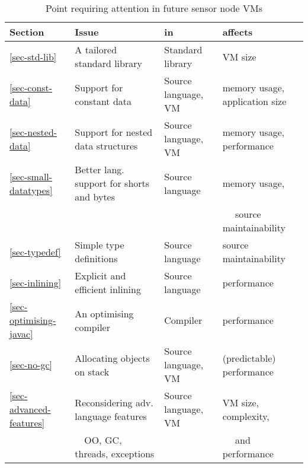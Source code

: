 \begin{table}
\caption{Point requiring attention in future sensor node VMs}
\label{tbl-issues}
    \begin{tabular}{llll}
    \toprule
    \bfseries Section           & \bfseries Issue                               & \bfseries in          & \bfseries affects \\
    \midrule
    \midrule
    \ref{sec-std-lib}           & A tailored standard library                   & Standard library      & VM size \\
    \ref{sec-const-data}        & Support for constant data                     & Source language, VM   & memory usage, application size \\
    \ref{sec-nested-data}       & Support for nested data structures            & Source language, VM   & memory usage, performance \\
    \ref{sec-small-datatypes}   & Better lang. support for shorts and bytes     & Source language       & memory usage, \\
                                &                                               &                       & ~~  source maintainability\\
    \ref{sec-typedef}           & Simple type definitions                       & Source language       & source maintainability \\
    \ref{sec-inlining}          & Explicit and efficient inlining               & Source language       & performance \\
    \ref{sec-optimising-javac}  & An optimising compiler                        & Compiler              & performance \\
    \ref{sec-no-gc}             & Allocating objects on stack                   & Source language, VM   & (predictable) performance \\
    \ref{sec-advanced-features} & Reconsidering adv. language features          & Source language, VM   & VM size, complexity, \\
                                & ~~OO, GC, threads, exceptions                 &                       & ~~ and performance \\
    \bottomrule
    \end{tabular}
\end{table}
